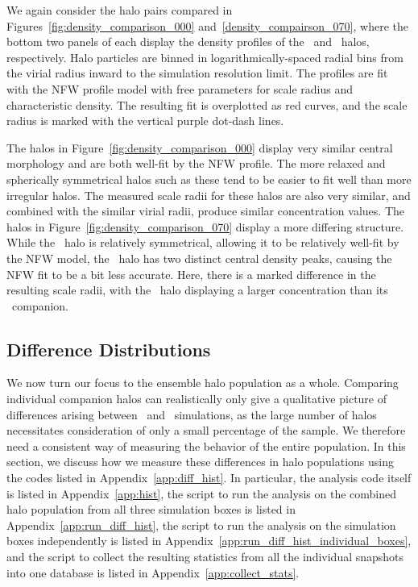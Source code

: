 We again consider the halo pairs compared in Figures~\ref{fig:density_comparison_000} and~\ref{density_compairson_070}, where the bottom two panels of each display the density profiles of the \lpt\ and \za\ halos, respectively.  Halo particles are binned in logarithmically-spaced radial bins from the virial radius inward to the simulation resolution limit.  The profiles are fit with the NFW profile model with free parameters for scale radius and characteristic density.  The resulting fit is overplotted as red curves, and the scale radius is marked with the vertical purple dot-dash lines.

The halos in Figure~\ref{fig:density_comparison_000} display very similar central morphology and are both well-fit by the NFW profile.  The more relaxed and spherically symmetrical halos such as these tend to be easier to fit well than more irregular halos.  The measured scale radii for these halos are also very similar, and combined with the similar virial radii, produce similar concentration values.  The halos in Figure~\ref{fig:density_comparison_070} display a more differing structure.  While the \lpt\ halo is relatively symmetrical, allowing it to be relatively well-fit by the NFW model, the \za\ halo has two distinct central density peaks, causing the NFW fit to be a bit less accurate.  Here, there is a marked difference in the resulting scale radii, with the \lpt\ halo displaying a larger concentration than its \za\ companion.




\subsection{Difference Distributions}
\label{subsec:analysis--difference_histograms}


We now turn our focus to the ensemble halo population as a whole.  Comparing individual companion halos can realistically only give a qualitative picture of differences arising between \lpt\ and \za\ simulations, as the large number of halos necessitates consideration of only a small percentage of the sample.  We therefore need a consistent way of measuring the behavior of the entire population.  In this section, we discuss how we measure these differences in halo populations using the codes listed in Appendix~\ref{app:diff_hist}.  In particular, the analysis code itself is listed in Appendix~\ref{app:hist}, the script to run the analysis on the combined halo population from all three simulation boxes is listed in Appendix~\ref{app:run_diff_hist}, the script to run the analysis on the simulation boxes independently is listed in Appendix~\ref{app:run_diff_hist_individual_boxes}, and the script to collect the resulting statistics from all the individual snapshots into one database is listed in Appendix~\ref{app:collect_stats}.



